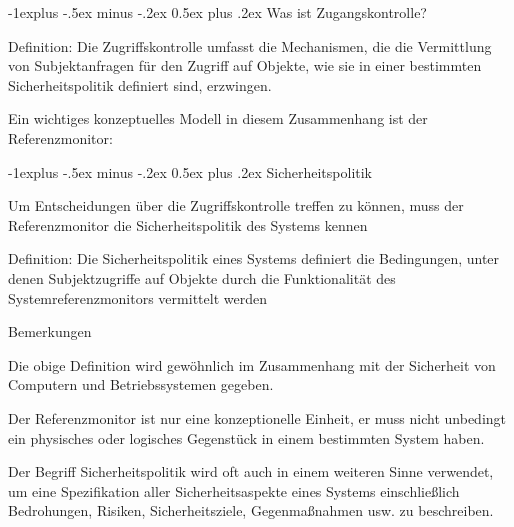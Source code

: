 \documentclass[a4paper]{article}
\makeatletter
\renewcommand{\subsection}{\@startsection{subsection}{2}{0mm}%
 {-1explus -.5ex minus -.2ex}%
 {0.5ex plus .2ex}%
 {\normalfont\normalsize\bfseries}}
\makeatother
\begin{document}
\begin{multicols}{3}
      \subsection{Was ist Zugangskontrolle?}
      \begin{itemize*}
            \item Definition: Die Zugriffskontrolle umfasst die Mechanismen, die die Vermittlung von Subjektanfragen für den Zugriff auf Objekte, wie sie in einer bestimmten Sicherheitspolitik definiert sind, erzwingen.
            \item Ein wichtiges konzeptuelles Modell in diesem Zusammenhang ist der Referenzmonitor:
      \end{itemize*}

      \subsection{Sicherheitspolitik}
      \begin{itemize*}
            \item Um Entscheidungen über die Zugriffskontrolle treffen zu können, muss der Referenzmonitor die Sicherheitspolitik des Systems kennen
            \item Definition: Die Sicherheitspolitik eines Systems definiert die Bedingungen, unter denen Subjektzugriffe auf Objekte durch die Funktionalität des Systemreferenzmonitors vermittelt werden
            \item Bemerkungen
            \begin{itemize*}
                  \item Die obige Definition wird gewöhnlich im Zusammenhang mit der Sicherheit von Computern und Betriebssystemen gegeben.
                  \item Der Referenzmonitor ist nur eine konzeptionelle Einheit, er muss nicht unbedingt ein physisches oder logisches Gegenstück in einem bestimmten System haben.
                  \item Der Begriff Sicherheitspolitik wird oft auch in einem weiteren Sinne verwendet, um eine Spezifikation aller Sicherheitsaspekte eines Systems einschließlich Bedrohungen, Risiken, Sicherheitsziele, Gegenmaßnahmen usw. zu beschreiben.
            \end{itemize*}
      \end{itemize*}


\end{multicols}
\end{document}
